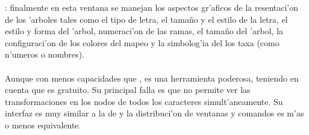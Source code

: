 : finalmente en esta ventana se manejan los aspectos gr'aficos de la resentaci'on de los 'arboles tales como el tipo de letra, el tama\~no y el estilo de la letra, el estilo y forma del 'arbol, numeraci'on de las ramas, el tama\~no del 'arbol, la configuraci'on de los colores  del mapeo y la simbolog'ia del los taxa (como n'umeros o nombres).\\
\\
Aunque con menos capacidades que ,  es una herramienta poderosa, teniendo en cuenta que es gratuito. Su principal falla es que no permite ver las transformaciones en los nodos de todos los caracteres simult'aneamente. Su interfaz es muy similar a la de  y la distribuci'on de ventanas y comandos es m'as o menos equivalente.\\
